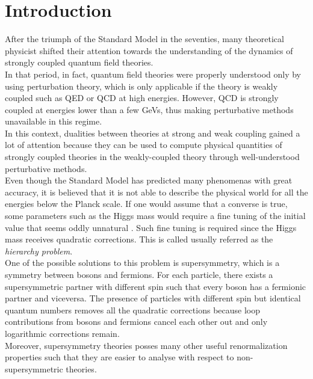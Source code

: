 \cleardoublepage
\chapter{Introduction}
After the triumph of the Standard Model in the seventies, many theoretical physicist shifted their attention towards the understanding of the dynamics of strongly coupled quantum field theories. \\
In that period, in fact, quantum field theories were properly understood only by using perturbation theory, which is only applicable if the theory is weakly coupled such as QED or QCD at high energies.
However, QCD is strongly coupled at energies lower than a few GeVs, thus making perturbative methods unavailable in this regime.
\\
In this context, dualities between theories at strong and weak coupling gained a lot of attention because they can be used to compute physical quantities of strongly coupled theories in the weakly-coupled theory through well-understood perturbative methods.
\\

Even though the Standard Model has predicted many phenomenas with great accuracy, it is believed that it is not able to describe the physical world for all the energies below the Planck scale.
If one would assume that a converse is true, some parameters such as the Higgs mass would require a fine tuning of the initial value that
seems oddly unnatural .
Such fine tuning is required since the Higgs mass receives quadratic corrections.
This is called usually referred as the \emph{hierarchy problem}.
\\
One of the possible solutions to this problem is supersymmetry, which is a symmetry between bosons and fermions. 
For each particle, there exists a supersymmetric partner with different spin  such that every boson has a fermionic partner and viceversa.
The presence of particles with different spin but identical quantum numbers removes all the quadratic corrections because loop contributions from bosons and fermions cancel each other out and only logarithmic corrections remain.
\\
Moreover, supersymmetry theories posses many other useful renormalization properties such that they are easier to analyse with respect to non-supersymmetric theories.\\





